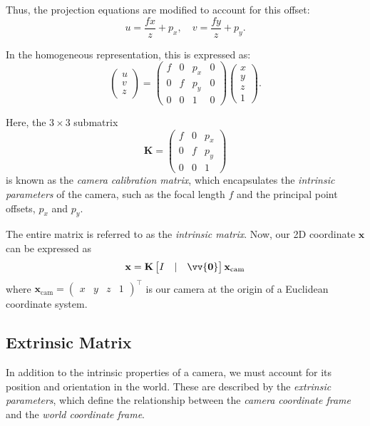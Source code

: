 \documentclass[12pt]{article}
\newcommand{\vect}[1]{\vv{\mathbf{#1}}}
\begin{document}
Thus, the projection equations are modified to account for this offset:
$$
u = \frac{f x}{z} + p_x, \quad v = \frac{f y}{z} + p_y.
$$

In the homogeneous representation, this is expressed as:
$$
\begin{pmatrix} u \\ v \\ z \end{pmatrix} = 
\begin{pmatrix}
f & 0 & p_x & 0 \\
0 & f & p_y & 0 \\
0 & 0 & 1 & 0
\end{pmatrix}
\begin{pmatrix} x \\ y \\ z \\ 1 \end{pmatrix}.
$$

Here, the $3 \times 3$ submatrix
$$
\mathbf{K} = \begin{pmatrix}
f & 0 & p_x \\
0 & f & p_y \\
0 & 0 & 1
\end{pmatrix}
$$
is known as the \textit{camera calibration matrix}, which encapsulates the \textit{intrinsic parameters} of the camera, such as the focal length $f$ and the principal point offsets, $p_x$ and $p_y$.

The entire matrix is referred to as the \textit{intrinsic matrix}. Now, our 2D coordinate  $\mathbf{x}$ can be expressed as
$$
\mathbf{x} = \mathbf{K}\begin{bmatrix}
    I & | & \vect{0}
\end{bmatrix}\mathbf{x}_\text{cam}
$$
where $\mathbf{x}_\text{cam}=\begin{pmatrix}
    x & y & z & 1
\end{pmatrix}^\top$ is our camera at the origin of a Euclidean coordinate system.

\subsection{Extrinsic Matrix}

In addition to the intrinsic properties of a camera, we must account for its position and orientation in the world. These are described by the \textit{extrinsic parameters}, which define the relationship between the \textit{camera coordinate frame} and the \textit{world coordinate frame}. 
\end{document}
